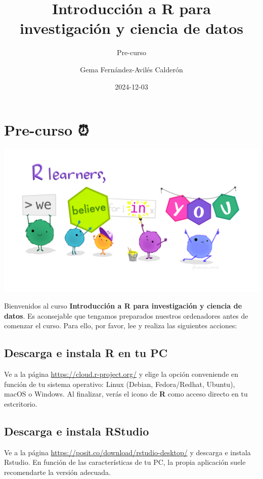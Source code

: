 \documentclass[
  letterpaper,
  DIV=11,
  numbers=noendperiod]{scrartcl}
\title{Introducción a R para investigación y ciencia de datos}
\subtitle{Pre-curso}
\author{Gema Fernández-Avilés Calderón}
\date{2024-12-03}
\renewcommand*\contentsname{Table of contents}
\newcommand\contentsname{Table of contents}
\begin{document}
\maketitle

\renewcommand*\contentsname{Table of contents}
{
\hypersetup{linkcolor=}
\setcounter{tocdepth}{3}
\tableofcontents
}

\section{Pre-curso ⏰}\label{pre-curso}

\includegraphics{img/00-Rlearners.png}

Bienvenidos al curso \textbf{Introducción a R para investigación y
ciencia de datos}. Es aconsejable que tengamos preparados nuestros
ordenadores antes de comenzar el curso. Para ello, por favor, lee y
realiza las siguientes acciones:

\subsection{Descarga e instala R en tu
PC}\label{descarga-e-instala-r-en-tu-pc}

Ve a la página \url{https://cloud.r-project.org/} y elige la opción
conveniende en función de tu sistema operativo: Linux (Debian,
Fedora/Redhat, Ubuntu), macOS o Windows. Al finalizar, verás el icono de
\textbf{R} como acceso directo en tu estcritorio.

\subsection{Descarga e instala
RStudio}\label{descarga-e-instala-rstudio}

Ve a la página \url{https://posit.co/download/rstudio-desktop/} y
descarga e instala Rstudio. En función de las características de tu PC,
la propia aplicación suele recomendarte la versión adecuada.
\end{document}
